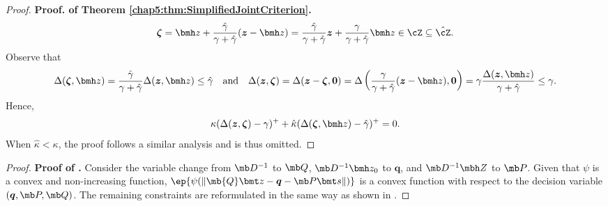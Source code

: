 \documentclass[opre, blindrev]{informs4}
\newcommand{\1}[1]{\mathds{1}{\left(#1\right)}}
\begin{document}
\begin{appendices}
\begin{proof}{\bf Proof. of Theorem \ref{chap5:thm:SimplifiedJointCriterion}.}
$$
\bm \zeta = \bmh z + \frac{\hat \gamma}{\gamma +\hat\gamma }(\bm z - \bmh z) =  \frac{\hat \gamma}{\gamma +\hat\gamma }\bm z + \frac{\gamma}{\gamma +\hat\gamma }\bmh z \in \cZ \subseteq \hat \cZ. 
$$
Observe that 
$$
\Delta(\bm \zeta,\bmh z) = \frac{\hat \gamma}{\gamma +\hat\gamma } \Delta(\bm z,\bmh z) \leq \hat \gamma
~~~\text{and}~~~
\Delta(\bm z,\bm \zeta)=\Delta(\bm z - \bm \zeta,\bm 0) = \Delta\left(  \frac{\gamma}{\gamma +\hat\gamma }(\bm z - \bmh z),\bm 0\right) = \gamma \frac{\Delta(\bm z,\bmh z)}{\gamma + \hat \gamma} \leq \gamma.
$$
Hence,
$$
\kappa (  \Delta(\bm z,\bm \zeta) - \gamma)^+ + \hat \kappa ( \Delta(\bm \zeta,\bmh z) - \hat \gamma)^+ = 0. 
$$
When $\hat \kappa < \kappa$, the proof follows a similar analysis and is thus omitted.
\hfill \Halmos
\end{proof}
\vspace{3mm}

\begin{proof}{\bf Proof of .}
Consider the variable change from $\mb D^{-1}$ to $\mb Q$, $\mb D^{-1} \bmh z_0$ to $\bm q$, and $\mb D^{-1} \mbh Z$ to $\mb P$. Given that $\psi$ is a convex and non-increasing function, $\ep{\psi(\|\mb{Q} \bmt z - \bm q - \mb P \bmt s\|)}$ is a convex function with respect to the decision variable $(\bm q,\mb P,\mb Q)$. The remaining constraints are reformulated in the same way as shown in .
\hfill \Halmos
\end{proof}
\vspace{3mm}


\end{appendices}
\end{document}
